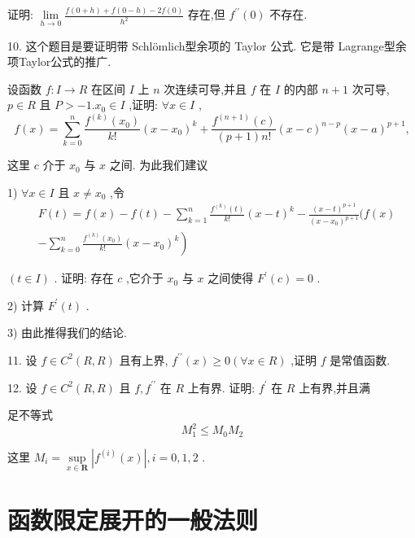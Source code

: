 证明: $\mathop{\lim }\limits_{{h \rightarrow  0}}\frac{f\left( {0 + h}\right)  + f\left( {0 - h}\right)  - {2f}\left( 0\right) }{{h}^{2}}$ 存在,但 ${f}^{\prime \prime }\left( 0\right)$ 不存在.

10. 这个题目是要证明带 Schlömlich型余项的 Taylor 公式. 它是带 Lagrange型余项Taylor公式的推广.

设函数 $f : I \rightarrow  R$ 在区间 $I$ 上 $n$ 次连续可导,并且 $f$ 在 $I$ 的内部 $n + 1$ 次可导, $p \in  R$ 且 $P >  - 1.{x}_{0} \in  I$ ,证明: $\forall x \in  I$ ,
$$f\left( x\right)  = \mathop{\sum }\limits_{{k = 0}}^{n}\frac{{f}^{\left( k\right) }\left( {x}_{0}\right) }{k!}{\left( x - {x}_{0}\right) }^{k} + \frac{{f}^{\left( n + 1\right) }\left( c\right) }{\left( {p + 1}\right) n!}{\left( x - c\right) }^{n - p}{\left( x - a\right) }^{p + 1},$$

这里 $c$ 介于 ${x}_{0}$ 与 $x$ 之间. 为此我们建议

1) $\forall x \in  I$ 且 $x \neq  {x}_{0}$ ,令
\begin{align*}
	&F\left( t\right)  = f\left( x\right)  - f\left( t\right)  - \mathop{\sum }\limits_{{k = 1}}^{n}\frac{{f}^{\left( k\right) }\left( t\right) }{k!}{\left( x - t\right) }^{k} - \frac{{\left( x - t\right) }^{p + 1}}{{\left( x - {x}_{0}\right) }^{p + 1}}(f\left( x\right)\\
	&\left. {-\mathop{\sum }\limits_{{k = 0}}^{n}\frac{{f}^{\left( k\right) }\left( {x}_{0}\right) }{k!}{\left( x - {x}_{0}\right) }^{k}}\right)
\end{align*}

$\left( {t \in  I}\right)$ . 证明: 存在 $c$ ,它介于 ${x}_{0}$ 与 $x$ 之间使得 ${F}^{\prime }\left( c\right)  = 0$ .

2) 计算 ${F}^{\prime }\left( t\right)$ .

3) 由此推得我们的结论.

11. 设 $f \in  {C}^{2}\left( {R,R}\right)$ 且有上界, ${f}^{\prime \prime }\left( x\right)  \geq  0\left( {\forall x \in  R}\right)$ ,证明 $f$ 是常值函数.

12. 设 $f \in  {C}^{2}\left( {R,R}\right)$ 且 $f,{f}^{\prime \prime }$ 在 $R$ 上有界. 证明: ${f}^{\prime }$ 在 $R$ 上有界,并且满

足不等式
$${M}_{1}^{2} \leq  {M}_{0}{M}_{2}$$

这里 ${M}_{i} = \mathop{\sup }\limits_{{x \in  \mathbf{R}}}\left| {{f}^{\left( i\right) }\left( x\right) }\right| ,i = 0,1,2$ .

\section{函数限定展开的一般法则}

